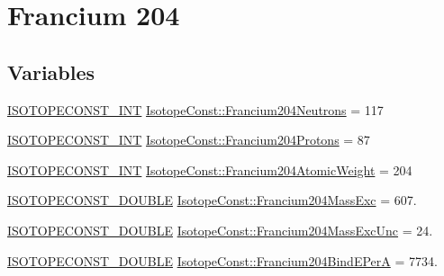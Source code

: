 \hypertarget{group___isotope_const-_francium-_fr204}{}\section{Francium 204}
\label{group___isotope_const-_francium-_fr204}
\subsection*{Variables}
\begin{DoxyCompactItemize}
\item 
\mbox{\hyperlink{group___isotope_const-_macros_ga5f18360b3e99483a35c32d789e62621c}{I\+S\+O\+T\+O\+P\+E\+C\+O\+N\+S\+T\+\_\+\+I\+NT}} \mbox{\hyperlink{group___isotope_const-_francium-_fr204_gaba73bd9bc4442ba3e2874429c4d20bb7}{Isotope\+Const\+::\+Francium204\+Neutrons}} = 117
\item 
\mbox{\hyperlink{group___isotope_const-_macros_ga5f18360b3e99483a35c32d789e62621c}{I\+S\+O\+T\+O\+P\+E\+C\+O\+N\+S\+T\+\_\+\+I\+NT}} \mbox{\hyperlink{group___isotope_const-_francium-_fr204_ga9c3195fe65857d4aac22b0f7b204bdce}{Isotope\+Const\+::\+Francium204\+Protons}} = 87
\item 
\mbox{\hyperlink{group___isotope_const-_macros_ga5f18360b3e99483a35c32d789e62621c}{I\+S\+O\+T\+O\+P\+E\+C\+O\+N\+S\+T\+\_\+\+I\+NT}} \mbox{\hyperlink{group___isotope_const-_francium-_fr204_ga5ad847826feca8f3033d99f7bfabb634}{Isotope\+Const\+::\+Francium204\+Atomic\+Weight}} = 204
\item 
\mbox{\hyperlink{group___isotope_const-_macros_ga8f45a7272ce02c0b4c65c44636ed719a}{I\+S\+O\+T\+O\+P\+E\+C\+O\+N\+S\+T\+\_\+\+D\+O\+U\+B\+LE}} \mbox{\hyperlink{group___isotope_const-_francium-_fr204_ga733b7dbc7a178035b311d92e106af8dd}{Isotope\+Const\+::\+Francium204\+Mass\+Exc}} = 607.
\item 
\mbox{\hyperlink{group___isotope_const-_macros_ga8f45a7272ce02c0b4c65c44636ed719a}{I\+S\+O\+T\+O\+P\+E\+C\+O\+N\+S\+T\+\_\+\+D\+O\+U\+B\+LE}} \mbox{\hyperlink{group___isotope_const-_francium-_fr204_ga1ad3d08a1bd6651dc48a1a68e3de099a}{Isotope\+Const\+::\+Francium204\+Mass\+Exc\+Unc}} = 24.
\item 
\mbox{\hyperlink{group___isotope_const-_macros_ga8f45a7272ce02c0b4c65c44636ed719a}{I\+S\+O\+T\+O\+P\+E\+C\+O\+N\+S\+T\+\_\+\+D\+O\+U\+B\+LE}} \mbox{\hyperlink{group___isotope_const-_francium-_fr204_gaea11e2f256dc5cdf3d7db13ff67b9bfc}{Isotope\+Const\+::\+Francium204\+Bind\+E\+PerA}} = 7734.
\item 

\end{DoxyCompactItemize}
